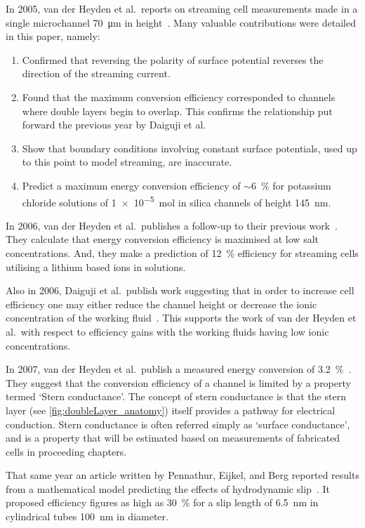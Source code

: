   In 2005, van der Heyden et al.\ reports on streaming cell measurements made in a single microchannel \SI{70}{\micro\meter} in height~\cite{VanderHeyden2005}.
  Many valuable contributions were detailed in this paper, namely:
  \begin{enumerate}
    \item Confirmed that reversing the polarity of surface potential reverses the direction of the streaming current.
    \item Found that the maximum conversion efficiency corresponded to channels where double layers begin to overlap. This confirms the relationship put forward the previous year by Daiguji et al.\
    \item Show that boundary conditions involving constant surface potentials, used up to this point to model streaming, are inaccurate.
    \item Predict a maximum energy conversion efficiency of $\sim$\SI{6}{\percent} for potassium chloride solutions of \SI{1e-5}{\mole} in silica channels of height \SI{145}{\nano\meter}.
  \end{enumerate}

  In 2006, van der Heyden et al.\ publishes a follow-up to their previous work~\cite{VanderHeyden2006}.
  They calculate that energy conversion efficiency is maximised at low salt concentrations.
  And, they make a prediction of \SI{12}{\percent} efficiency for streaming cells utilising a lithium based ions in solutions.

  Also in 2006, Daiguji et al.\ publish work suggesting that in order to increase cell efficiency one may either reduce the channel height or decrease the ionic concentration of the working fluid~\cite{Daiguji2006}.
  This supports the work of van der Heyden et al.\ with respect to efficiency gains with the working fluids having low ionic concentrations.

  In 2007, van der Heyden et al.\ publish a measured energy conversion of \SI{3.2}{\percent}~\cite{Heyden2007}.
  They suggest that the conversion efficiency of a channel is limited by a property termed `Stern conductance'.
  The concept of stern conductance is that the stern layer (see \cref{fig:doubleLayer_anatomy}) itself provides a pathway for electrical conduction.
  Stern conductance is often referred simply as `surface conductance', and is a property that will be estimated based on measurements of fabricated cells in proceeding chapters.

  That same year an article written by Pennathur, Eijkel, and Berg reported results from a mathematical model predicting the effects of hydrodynamic slip~\cite{Pennathur2007}.
  It proposed efficiency figures as high as \SI{30}{\percent} for a slip length of \SI{6.5}{\nano\meter} in cylindrical tubes \SI{100}{\nano\meter} in diameter.

